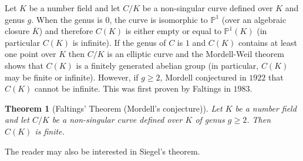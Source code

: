 \documentclass[12pt]{article}
\newtheorem*{thm}{Theorem}
\theoremstyle{definition}
\begin{document}
Let $K$ be a number field and let $C/K$ be a non-singular curve defined over $K$ and genus $g$. When the genus is $0$, the curve is isomorphic to $\mathbb{P}^1$ (over an algebraic closure $\overline{K}$) and therefore $C(K)$ is either empty or equal to $\mathbb{P}^1(K)$ (in particular $C(K)$ is infinite). If the genus of $C$ is $1$ and $C(K)$ contains at least one point over $K$ then $C/K$ is an elliptic curve and the Mordell-Weil theorem shows that $C(K)$ is a finitely generated abelian group (in particular, $C(K)$ may be finite or infinite). However, if $g\geq 2$, Mordell conjectured in $1922$ that $C(K)$ cannot be infinite. This was first proven by Faltings in $1983$.

\begin{thm}[Faltings' Theorem (Mordell's conjecture)]
Let $K$ be a number field and let $C/K$ be a non-singular curve defined over $K$ of genus $g\geq 2$. Then $C(K)$ is finite. 
\end{thm}

The reader may also be interested in Siegel's theorem.
\end{document}
